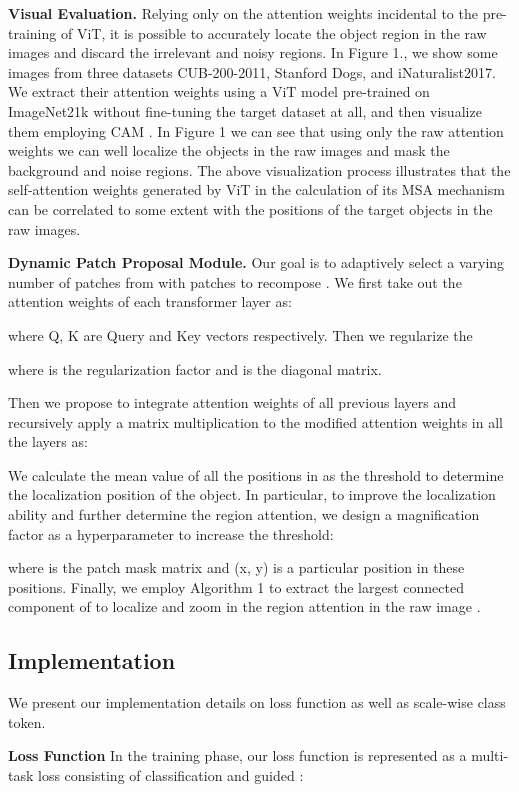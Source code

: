 \documentclass[sigconf]{acmart}
\begin{document}
\textbf{Visual Evaluation.} Relying only on the attention weights incidental to the pre-training of ViT, it is possible to accurately locate the object region in the raw images and discard the irrelevant and noisy regions. In Figure 1., we show some images from three datasets CUB-200-2011, Stanford Dogs, and iNaturalist2017. We extract their attention weights using a ViT model pre-trained on ImageNet21k without fine-tuning the target dataset at all, and then visualize them employing CAM \cite{CAM}. In Figure 1 we can see that using only the raw attention weights we can well localize the objects in the raw images and mask the background and noise regions. The above visualization process illustrates that the self-attention weights generated by ViT in the calculation of its MSA mechanism can be correlated to some extent with the positions of the target objects in the raw images.


\textbf{Dynamic Patch Proposal Module.}
Our goal is to adaptively select a varying number of patches from  with  patches to recompose . We first take out the attention weights of each transformer layer as:



where Q, K are Query and Key vectors respectively.
Then we regularize the 

where  is the regularization factor and  is the diagonal matrix.

Then we propose to integrate attention weights of all previous layers and recursively apply a matrix multiplication to the modified attention weights in all the layers as:


We calculate the mean value  of all the positions in  as the threshold to determine the localization position of the object. In particular, to improve the localization ability and further determine the region attention, we design a magnification factor  as a hyperparameter to increase the threshold:

where  is the patch mask matrix and (x, y) is a particular position in these  positions.
Finally, we employ Algorithm 1 to extract the largest connected component of  to localize and zoom in the region attention in the raw image .

\subsection{Implementation}
We present our implementation details on loss function as well as scale-wise class token.

    \textbf{Loss Function} In the training phase, our loss function is represented as a multi-task loss  consisting of classification  and guided :
\end{document}

